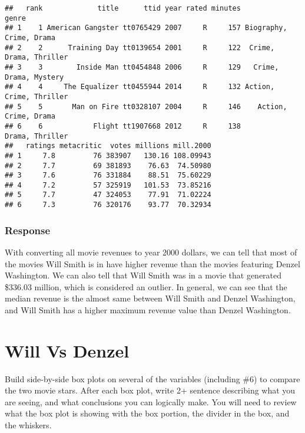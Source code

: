 \documentclass[
]{article}
\newenvironment{Shaded}{\begin{snugshade}}{\end{snugshade}}
\newcommand{\FloatTok}[1]{\textcolor[rgb]{0.00,0.00,0.81}{#1}}
\newcommand{\KeywordTok}[1]{\textcolor[rgb]{0.13,0.29,0.53}{\textbf{#1}}}
\newcommand{\NormalTok}[1]{#1}
\newcommand{\OperatorTok}[1]{\textcolor[rgb]{0.81,0.36,0.00}{\textbf{#1}}}
\begin{document}
\begin{Shaded}
\begin{Highlighting}[]
\begin{Shaded}
\end{Shaded}

\begin{verbatim}
##   rank             title      ttid year rated minutes                   genre
## 1    1 American Gangster tt0765429 2007     R     157 Biography, Crime, Drama
## 2    2      Training Day tt0139654 2001     R     122  Crime, Drama, Thriller
## 3    3        Inside Man tt0454848 2006     R     129   Crime, Drama, Mystery
## 4    4     The Equalizer tt0455944 2014     R     132 Action, Crime, Thriller
## 5    5       Man on Fire tt0328107 2004     R     146    Action, Crime, Drama
## 6    6            Flight tt1907668 2012     R     138         Drama, Thriller
##   ratings metacritic  votes millions mill.2000
## 1     7.8         76 383907   130.16 108.09943
## 2     7.7         69 381893    76.63  74.50980
## 3     7.6         76 331884    88.51  75.60229
## 4     7.2         57 325919   101.53  73.85216
## 5     7.7         47 324053    77.91  71.02224
## 6     7.3         76 320176    93.77  70.32934
\end{verbatim}

\hypertarget{response-2}{%
\subsubsection{Response}\label{response-2}}

With converting all movie revenues to year 2000 dollars, we can tell
that most of the movies Will Smith is in have higher revenue than the
movies featuring Denzel Washington. We can also tell that Will Smith was
in a movie that generated \$336.03 million, which is considered an
outlier. In general, we can see that the median revenue is the almost
same between Will Smith and Denzel Washington, and Will Smith has a
higher maximum revenue value than Denzel Washington.

\hypertarget{will-vs-denzel}{%
\section{Will Vs Denzel}\label{will-vs-denzel}}

Build side-by-side box plots on several of the variables (including \#6)
to compare the two movie stars. After each box plot, write 2+ sentence
describing what you are seeing, and what conclusions you can logically
make. You will need to review what the box plot is showing with the box
portion, the divider in the box, and the whiskers.


\end{Highlighting}
\end{Shaded}
\end{document}
